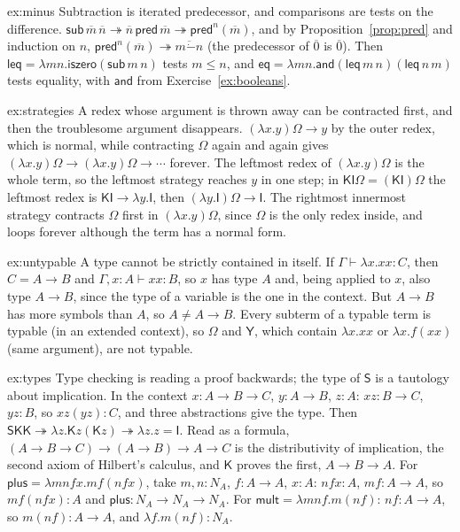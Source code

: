 \begin{solution}{ex:minus}
\idea Subtraction is iterated predecessor, and comparisons are tests on the difference.
\writeup $\mathsf{sub}\,\overline m\,\overline n\twoheadrightarrow\overline n\,\mathsf{pred}\,\overline m\twoheadrightarrow\mathsf{pred}^n(\overline m)$, and by Proposition~\ref{prop:pred} and induction on $n$, $\mathsf{pred}^n(\overline m)\twoheadrightarrow\overline{m\dot-n}$ (the predecessor of $\overline0$ is $\overline0$). Then $\mathsf{leq}=\lambda mn.\mathsf{iszero}(\mathsf{sub}\,m\,n)$ tests $m\le n$, and $\mathsf{eq}=\lambda mn.\mathsf{and}(\mathsf{leq}\,m\,n)(\mathsf{leq}\,n\,m)$ tests equality, with $\mathsf{and}$ from Exercise~\ref{ex:booleans}.
\end{solution}

\begin{solution}{ex:strategies}
\idea A redex whose argument is thrown away can be contracted first, and then the troublesome argument disappears.
\writeup $(\lambda x.y)\Omega\to y$ by the outer redex, which is normal, while contracting $\Omega$ again and again gives $(\lambda x.y)\Omega\to(\lambda x.y)\Omega\to\cdots$ forever. The leftmost redex of $(\lambda x.y)\Omega$ is the whole term, so the leftmost strategy reaches $y$ in one step; in $\mathsf K\mathsf I\Omega=(\mathsf K\mathsf I)\Omega$ the leftmost redex is $\mathsf K\mathsf I\to\lambda y.\mathsf I$, then $(\lambda y.\mathsf I)\Omega\to\mathsf I$. The rightmost innermost strategy contracts $\Omega$ first in $(\lambda x.y)\Omega$, since $\Omega$ is the only redex inside, and loops forever although the term has a normal form.
\end{solution}

\begin{solution}{ex:untypable}
\idea A type cannot be strictly contained in itself.
\writeup If $\Gamma\vdash\lambda x.xx:C$, then $C=A\to B$ and $\Gamma,x:A\vdash xx:B$, so $x$ has type $A$ and, being applied to $x$, also type $A\to B$, since the type of a variable is the one in the context. But $A\to B$ has more symbols than $A$, so $A\ne A\to B$. Every subterm of a typable term is typable (in an extended context), so $\Omega$ and $\mathsf Y$, which contain $\lambda x.xx$ or $\lambda x.f(xx)$ (same argument), are not typable.
\end{solution}

\begin{solution}{ex:types}
\idea Type checking is reading a proof backwards; the type of $\mathsf S$ is a tautology about implication.
\writeup In the context $x:A\to B\to C$, $y:A\to B$, $z:A$: $xz:B\to C$, $yz:B$, so $xz(yz):C$, and three abstractions give the type. Then $\mathsf S\mathsf K\mathsf K\twoheadrightarrow\lambda z.\mathsf Kz(\mathsf Kz)\twoheadrightarrow\lambda z.z=\mathsf I$. Read as a formula, $(A\to B\to C)\to(A\to B)\to A\to C$ is the distributivity of implication, the second axiom of Hilbert's calculus, and $\mathsf K$ proves the first, $A\to B\to A$. For $\mathsf{plus}=\lambda mnfx.mf(nfx)$, take $m,n:N_A$, $f:A\to A$, $x:A$: $nfx:A$, $mf:A\to A$, so $mf(nfx):A$ and $\mathsf{plus}:N_A\to N_A\to N_A$. For $\mathsf{mult}=\lambda mnf.m(nf)$: $nf:A\to A$, so $m(nf):A\to A$, and $\lambda f.m(nf):N_A$.
\end{solution}

